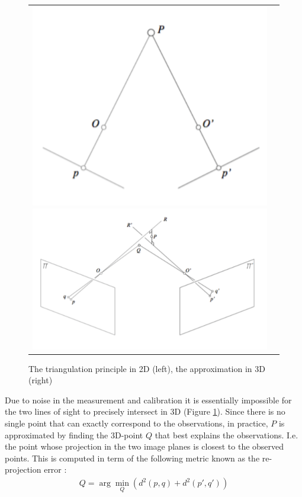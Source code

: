 \documentclass[twoside]{article}
\begin{document}
\begin{figure}[h!]
  \begin{center}
	\begin{tabular}{cc}
	  \includegraphics[scale=0.3]{triangulation.png}
	  \includegraphics[scale=0.3]{approximation.png}
	\end{tabular}
  \end{center}
  \caption{The triangulation principle in 2D (left), the approximation in 3D (right)}
  \label{triangle}
\end{figure}

Due to noise in the measurement and calibration it is essentially impossible for the two lines of sight to precisely intersect in 3D (Figure \ref{triangle}). Since there is no single point that can exactly correspond to the observations, in practice, $P$ is approximated by finding the 3D-point $Q$ that best explains the observations. I.e. the point whose projection in the two image planes is closest to the observed points. This is computed in term of the following metric known as the re-projection error :
\begin{align}
Q = \arg\!\min_Q (d^2(p, q) + d^2(p', q'))
\end{align}
\end{document}
